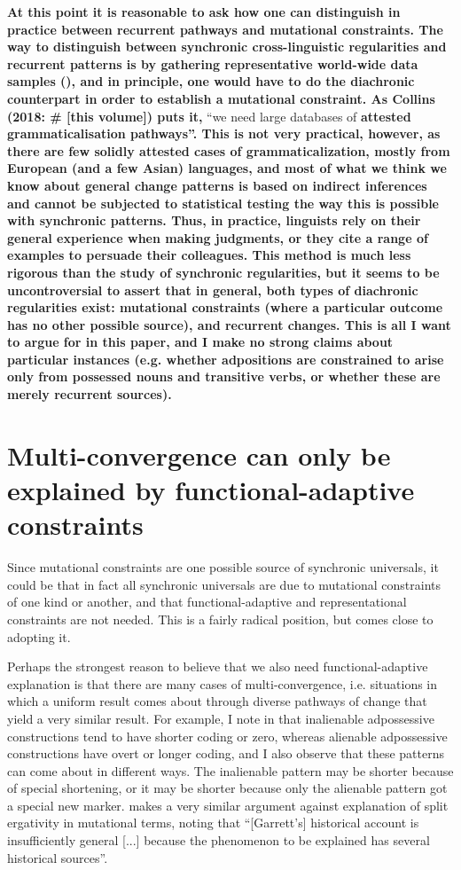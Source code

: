 \documentclass[output=paper]{langsci/langscibook}
\begin{document}
\textbf{{At this point it is reasonable to ask how one can distinguish in practice between recurrent pathways and mutational constraints. The way to distinguish between synchronic cross-linguistic regularities and recurrent patterns is by gathering representative world-wide data samples (), and in principle, one would have to do the diachronic counterpart in order to establish a mutational constraint. As Collins (2018: \# [this volume]) puts it,} }“we need large databases of \textbf{{attested grammaticalisation pathways”. This is not very practical, however, as there are few solidly attested cases of grammaticalization, mostly from European (and a few Asian) languages, and most of what we think we know about general change patterns is based on indirect inferences and cannot be subjected to statistical testing the way this is possible with synchronic patterns. Thus, in practice, linguists rely on their general experience when making judgments, or they cite a range of examples to persuade their colleagues. This method is much less rigorous than the study of synchronic regularities, but it seems to be uncontroversial to assert that in general, both types of diachronic regularities exist: mutational constraints (where a particular outcome has no other possible source), and recurrent changes. This is all I want to argue for in this paper, and I make no strong claims about particular instances (e.g. whether adpositions are constrained to arise only from possessed nouns and transitive verbs, or whether these are merely recurrent sources).} }
 

\section{Multi-convergence can only be explained by functional-adaptive constraints}

Since mutational constraints are one possible source of synchronic universals, it could be that in fact all synchronic universals are due to mutational constraints of one kind or another, and that functional-adaptive and representational constraints are not needed. This is a fairly radical position, but \citet{Cristofaro2017} comes close to adopting it.

Perhaps the strongest reason to believe that we also need functional-adaptive explanation is that there are many cases of multi-convergence, i.e. situations in which a uniform result comes about through diverse pathways of change that yield a very similar result. For example, I note in \citet{Haspelmath2017} that inalienable adpossessive constructions tend to have shorter coding or zero, whereas alienable adpossessive constructions have overt or longer coding, and I also observe that these patterns can come about in different ways. The inalienable pattern may be shorter because of special shortening, or it may be shorter because only the alienable pattern got a special new marker. \citet[37]{Kiparsky2008} makes a very similar argument against  explanation of split ergativity in mutational terms, noting that “[Garrett’s] historical account is insufficiently general [...] because the phenomenon to be explained has several historical sources”.
\end{document}
